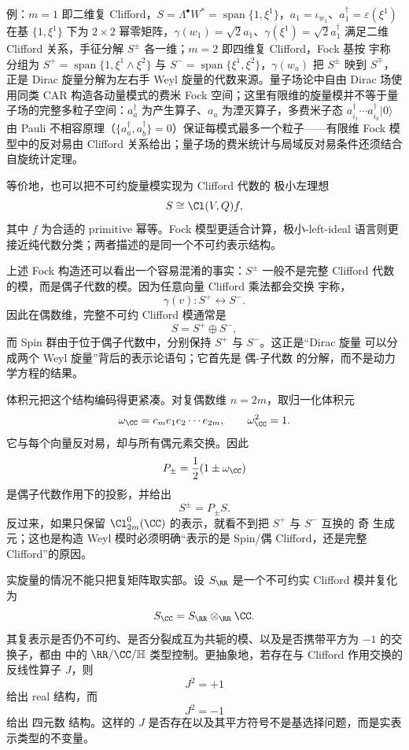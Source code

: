 例：$m=1$ 即二维复 Clifford，$S=\Lambda^\bullet W^*=\operatorname{span}\{1,\xi^1\}$，$a_1=\iota_{w_1}$、$a_1^\dagger=\varepsilon(\xi^1)$ 在基 $\{1,\xi^1\}$ 下为 $2\times2$ 幂零矩阵，$\gamma(w_1)=\sqrt2a_1$、$\gamma(\xi^1)=\sqrt2a_1^\dagger$ 满足二维 Clifford 关系，手征分解 $S^\pm$ 各一维；$m=2$ 即四维复 Clifford，Fock 基按 宇称 分组为 $S^+=\operatorname{span}\{1,\xi^1\wedge\xi^2\}$ 与 $S^-=\operatorname{span}\{\xi^1,\xi^2\}$，$\gamma(w_a)$ 把 $S^\pm$ 映到 $S^\mp$，正是 Dirac 旋量分解为左右手 Weyl 旋量的代数来源。量子场论中自由 Dirac 场使用同类 CAR 构造各动量模式的费米 Fock 空间；这里有限维的旋量模并不等于量子场的完整多粒子空间：$a_a^\dagger$ 为产生算子、$a_a$ 为湮灭算子，多费米子态 $a_{i_1}^\dagger\cdots a_{i_k}^\dagger|0\rangle$ 由 Pauli 不相容原理（$\{a_a^\dagger,a_b^\dagger\}=0$）保证每模式最多一个粒子——有限维 Fock 模型中的反对易由 Clifford 关系给出；量子场的费米统计与局域反对易条件还须结合自旋统计定理。

等价地，也可以把不可约旋量模实现为 Clifford 代数的 极小左理想
\[
S\cong\Cl(V,Q)f,
\]
其中 $f$ 为合适的 primitive 幂等。Fock 模型更适合计算，极小-left-ideal 语言则更接近纯代数分类；两者描述的是同一个不可约表示结构。

上述 Fock 构造还可以看出一个容易混淆的事实：$S^\pm$ 一般不是完整 Clifford 代数的模，而是偶子代数的模。因为任意向量 Clifford 乘法都会交换 宇称，
\[
\gamma(v):S^+\leftrightarrow S^-.
\]
因此在偶数维，完整不可约 Clifford 模通常是
\[
S=S^+\oplus S^-,
\]
而 Spin 群由于位于偶子代数中，分别保持 $S^+$ 与 $S^-$。这正是“Dirac 旋量 可以分成两个 Weyl 旋量”背后的表示论语句；它首先是 偶-子代数 的分解，而不是动力学方程的结果。

体积元把这个结构编码得更紧凑。对复偶数维 $n=2m$，取归一化体积元
\[
\omega_{\CC}=c_m e_1e_2\cdots e_{2m},
\qquad
\omega_{\CC}^2=1.
\]
它与每个向量反对易，却与所有偶元素交换。因此
\[
P_\pm=\frac12(1\pm\omega_{\CC})
\]
是偶子代数作用下的投影，并给出
\[
S^\pm=P_\pm S.
\]
反过来，如果只保留 $\Cl_{2m}^0(\CC)$ 的表示，就看不到把 $S^+$ 与 $S^-$ 互换的 奇 生成元；这也是构造 Weyl 模时必须明确“表示的是 Spin/偶 Clifford，还是完整 Clifford”的原因。

实旋量的情况不能只把复矩阵取实部。设 $S_\RR$ 是一个不可约实 Clifford 模并复化为
\[
S_\CC=S_\RR\otimes_\RR\CC.
\]
其复表示是否仍不可约、是否分裂成互为共轭的模、以及是否携带平方为 $-1$ 的交换子，都由 中的 $\RR/\CC/\mathbb H$ 类型控制。更抽象地，若存在与 Clifford 作用交换的反线性算子 $J$，则
\[
J^2=+1
\]
给出 real 结构，而
\[
J^2=-1
\]
给出 四元数 结构。这样的 $J$ 是否存在以及其平方符号不是基选择问题，而是实表示类型的不变量。

